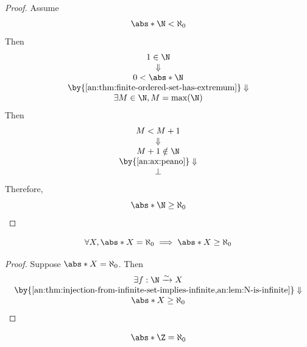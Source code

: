 \begin{proof}
  Assume
  \[
    \abs*{\N} < \aleph_{0}
  \]
  Then
  \[
    \begin{array}{c}
      1 \in \N                                                      \\
      \Downarrow                                                    \\
      0 < \abs*{\N}                                                 \\
      \by{\Cref{an:thm:finite-ordered-set-has-extremum}} \Downarrow \\
      \exists M \in \N, M = \max(\N)
    \end{array}
  \]
  Then
  \[
    \begin{array}{c}
      M < M + 1                          \\
      \Downarrow                         \\
      M + 1 \notin \N                    \\
      \by{\Cref{an:ax:peano}} \Downarrow \\
      \bot
    \end{array}
  \]
  Therefore,
  \[
    \abs*{\N} \geq \aleph_{0}
  \]
\end{proof}

\bigskip

\begin{theorem} \label{an:thm:countable-set-is-infinite}
  \[
    \forall X, \abs*{X} = \aleph_{0} \implies \abs*{X} \geq \aleph_{0}
  \]
\end{theorem}

\begin{proof}
  Suppose $\abs*{X} = \aleph_{0}$. Then
  \[
    \begin{array}{c}
      \exists f: \N \xrightarrow{\sim} X                                                              \\
      \by{\Cref{an:thm:injection-from-infinite-set-implies-infinite,an:lem:N-is-infinite}} \Downarrow \\
      \abs*{X} \geq \aleph_{0}
    \end{array}
  \]
\end{proof}

\bigskip

\begin{theorem} \label{an:thm:Z-is-countable}
  \[
    \abs*{\Z} = \aleph_{0}
  \]
\end{theorem}

